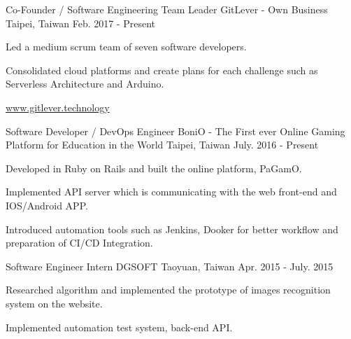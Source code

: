 \begin{cventries}
   \cventry
    {Co-Founder / Software Engineering Team Leader}
    {GitLever - Own Business}
    {Taipei, Taiwan}
    {Feb. 2017 - Present}
    {
      \begin{cvitems}
        \item {Led a medium scrum team of seven software developers.}
        \item {Consolidated cloud platforms and create plans for each challenge such as Serverless Architecture and Arduino.}
        \item{{\color{red}\href{www.gitlever.technology}{www.gitlever.technology}}}
      \end{cvitems}
    }
  \cventry
    {Software Developer / DevOps Engineer}
    {BoniO - The First ever Online Gaming Platform for Education in the World}
    {Taipei, Taiwan}
    {July. 2016 - Present}
    {
      \begin{cvitems}
        \item {Developed in Ruby on Rails and built the online platform, PaGamO.}
      \item{Implemented API server which is communicating with the web front-end and IOS/Android APP.}
       \item {Introduced automation tools such as Jenkins, Dooker for better workflow and preparation of CI/CD Integration.}
      \end{cvitems}
    }
  \cventry
    {Software Engineer Intern}
    {DGSOFT}
    {Taoyuan, Taiwan}
    {Apr. 2015 - July. 2015}
    {
      \begin{cvitems}
        \item {Researched algorithm and implemented the prototype of images recognition system on the website.}
        \item {Implemented automation test system, back-end API.}
      \end{cvitems} 
    }
\end{cventries}
\vspace{-\baselineskip}